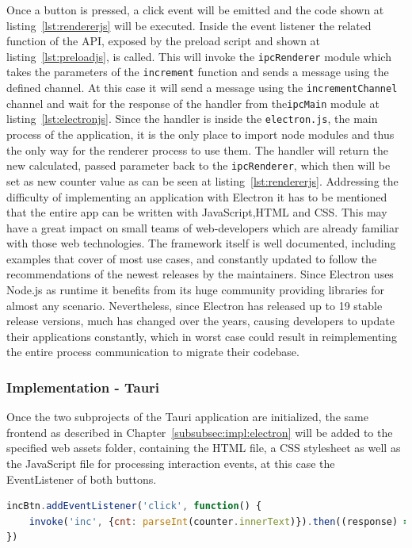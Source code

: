 Once a button is pressed, a click event will be emitted and the code shown at listing~\ref{lst:rendererjs} will be executed.
Inside the event listener the related function of the \ac{API}, exposed by the preload script and shown at listing~\ref{lst:preloadjs}, is called.
This will invoke the \texttt{ipcRenderer} module which takes the parameters of the \texttt{increment} function and sends a message using the defined channel.
At this case it will send a message using the \texttt{incrementChannel} channel and wait for the response of the handler from the\texttt{ipcMain} module at listing~\ref{lst:electronjs}.
Since the handler is inside the \texttt{electron.js}, the main process of the application, it is the only place to import node modules and thus the only way for the renderer process to use them.
The handler will return the new calculated, passed parameter back to the \texttt{ipcRenderer}, which then will be set as new counter value as can be seen at listing~\ref{lst:rendererjs}.
Addressing the difficulty of implementing an application with Electron it has to be mentioned that the entire app can be written with JavaScript,\ac{HTML} and \ac{CSS}.
This may have a great impact on small teams of web-developers which are already familiar with those web technologies.
The framework itself is well documented, including examples that cover of most use cases, and constantly updated to follow the recommendations of the newest releases by the maintainers.
Since Electron uses Node.js as runtime it benefits from its huge community providing libraries for almost any scenario.
Nevertheless, since Electron has released up to 19 stable release versions, much has changed over the years, causing developers to update their applications constantly, which in worst case could result
in reimplementing the entire process communication to migrate their codebase.
\subsubsection{Implementation - Tauri}
Once the two subprojects of the Tauri application are initialized, the same frontend as described in Chapter~\ref{subsubsec:impl:electron} will be added to the specified web assets folder,
containing the \ac{HTML} file, a \ac{CSS} stylesheet as well as the JavaScript file for processing interaction events, at this case the EventListener of both buttons. \\

\begin{lstlisting}[language=JavaScript,label={lst:indexjsTauri}, caption={Excerpt of index.js}]
incBtn.addEventListener('click', function() {
    invoke('inc', {cnt: parseInt(counter.innerText)}).then((response) => counter.innerText=response)
})
\end{lstlisting}


